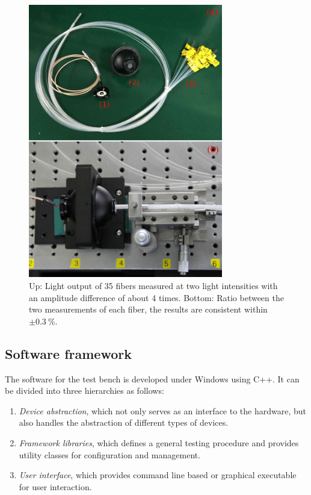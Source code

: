 \documentclass{nst}
\begin{document}
\begin{figure}[!htb]
	\centering
	\includegraphics[width=85mm]{FIG3}
	\caption{Up: Light output of 35 fibers measured at two light intensities with an amplitude difference of about 4 times.
		Bottom: Ratio between the two measurements of each fiber, the results are consistent within $\pm\SI{0.3}{\percent}$.}
	\label{fig:FIG3}
\end{figure} 

\subsection{Software framework}
\label{sec:software}

The software for the test bench is developed under Windows using C++. It can be divided into three hierarchies as follows:
\begin{enumerate}
	\item \textit{Device abstraction}, which not only serves as an interface to the hardware, but also handles the abstraction of different types of devices. 
	\item \textit{Framework libraries}, which defines a general testing procedure and provides utility classes for configuration and management.
	\item \textit{User interface}, which provides command line based or graphical executable for user interaction. 
\end{enumerate}
\end{document}
